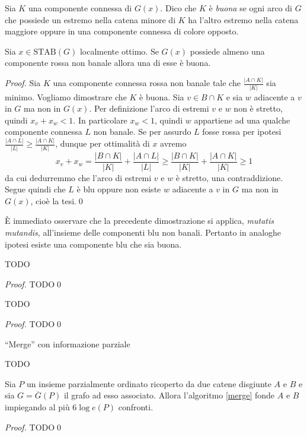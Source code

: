 \begin{definition}
	Sia \(K\) una componente connessa di \(G(x)\). Dico che \(K\) è \emph{buona} se ogni arco di \(G\) che possiede un estremo nella catena minore di \(K\) ha l'altro estremo nella catena maggiore oppure in una componente connessa di colore opposto. 
\end{definition}
\begin{lemma}
	\label{goodlemma} Sia \(x\in \text{STAB}(G)\) localmente ottimo. Se \(G(x)\) possiede almeno una componente rossa non banale allora una di esse è buona. 
\end{lemma}
\begin{proof}
	Sia \(K\) una componente connessa rossa non banale tale che \(\frac{|A\cap K|}{|K|}\) sia minimo. Vogliamo dimostrare che \(K\) è buona. Sia \(v\in B\cap K\) e sia \(w\) adiacente a \(v\) in \(G\) ma non in \(G(x)\). Per definizione l'arco di estremi \(v\) e \(w\) non è stretto, quindi \(x_v+x_w<1\). In particolare \(x_w<1\), quindi \(w\) appartiene ad una qualche componente connessa \(L\) non banale. Se per assurdo \(L\) fosse rossa per ipotesi \(\frac{|A\cap L|}{|L|}\ge\frac{|A\cap K|}{|K|}\), dunque per ottimalità di \(x\) avremo
	\[x_v+x_w=\frac{|B\cap K|}{|K|}+\frac{|A\cap L|}{|L|}\ge\frac{|B\cap K|}{|K|}+\frac{|A\cap K|}{|K|}\ge 1\]
	da cui dedurremmo che l'arco di estremi \(v\) e \(w\) è stretto, una contraddizione. Segue quindi che \(L\) è blu oppure non esiste \(w\) adiacente a \(v\) in \(G\) ma non in \(G(x)\), cioè la tesi.\qed 
\end{proof}
È immediato osservare che la precedente dimostrazione si applica, \emph{mutatis mutandis}, all'insieme delle componenti blu non banali. Pertanto in analoghe ipotesi esiste una componente blu che sia buona. 
\begin{lemma}
	\label{evolutionlemma} TODO 
\end{lemma}
\begin{proof}
	TODO\qed 
\end{proof}
\begin{lemma}
	\label{finallemma} TODO 
\end{lemma}
\begin{proof}
	TODO\qed 
\end{proof}
\begin{algorithm}
	\caption{``Merge'' con informazione parziale} \label{merge} 
	\begin{algorithmic}
		[1] \STATE TODO 
	\end{algorithmic}
\end{algorithm}
\begin{theorem}
	\label{mergetheorem} Sia \(P\) un insieme parzialmente ordinato ricoperto da due catene disgiunte \(A\) e \(B\) e sia \(G=\overline{G}(P)\) il grafo ad esso associato. Allora l'algoritmo \ref{merge} fonde \(A\) e \(B\) impiegando al più \(6\log{e(P)}\) confronti. 
\end{theorem}
\begin{proof}
	TODO\qed 
\end{proof}


